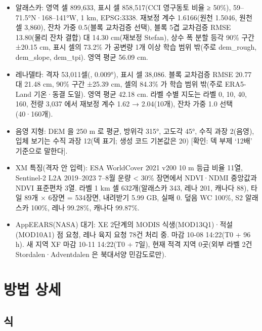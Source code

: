 \begin{itemize}[leftmargin=1.4em, itemsep=0.15em]
  \item 알래스카: 영역 셀 899,633, 표시 셀 858,517(CCI 영구동토 비율 ≥ 50\%), 59–71.5°N·168–141°W, 1 km, EPSG:3338. 재보정 계수 1.6166(원천 1.5046, 원천 셀 3,860), 잔차 가중 0.5(블록 교차검증 선택), 블록 5겹 교차검증 RMSE 13.80(물리 잔차 결합) 대 14.30 cm(재보정 Stefan), 상수 폭 분할 등각 90\% 구간 ±20.15 cm, 표시 셀의 73.2\% 가 공변량 1개 이상 학습 범위 밖(주로 dem\_rough, dem\_slope, dem\_tpi). 영역 평균 56.09 cm.
  \item 레나델타: 격자 53,011셀(, 0.009°), 표시 셀 38,086. 블록 교차검증 RMSE 20.77 대 21.48 cm, 90\% 구간 ±25.39 cm, 셀의 84.3\% 가 학습 범위 밖(주로 ERA5-Land 기온·동결 도일). 영역 평균 42.18 cm. 라벨 수별 지도는 라벨 0, 10, 40, 160, 전량 3,037 에서 재보정 계수 1.62 → 2.04(10개), 잔차 가중 1.0 선택(40·160개).
  \item 음영 지형: DEM 을 250 m 로 평균, 방위각 315°, 고도각 45°, 수직 과장 2(음영), 입체 보기는 수직 과장 12(덱 표기; 생성 코드 기본값은 20) [확인: 덱 부제 ‘12배’ 기준으로 말한다].
  \item XM 특징(격자 안 입력): ESA WorldCover 2021 v200 10 m 등급 비율 11열, Sentinel-2 L2A 2019–2023 7–8월 운량 < 30\% 장면에서 NDVI·NDMI 중앙값과 NDVI 표준편차 3열. 라벨 1 km 셀 632개(알래스카 343, 레나 201, 캐나다 88), 타일 89개 × 6장면 = 534장면, 내려받기 5.99 GB, 실패 0. 덮음 WC 100\%, S2 알래스카 100\%, 레나 99.28\%, 캐나다 99.87\%.
  \item AppEEARS(NASA) 대기: XE 2단계의 MODIS 식생(MOD13Q1)·적설(MOD10A1) 점 요청, 레나 육지 요청 78건 처리 중. 마감 10-08 14:22(T0 + 96 h). 새 지역 XF 마감 10-11 14:22(T0 + 7일), 현재 적격 지역 0곳(외부 라벨 2건 Stordalen·Adventdalen 은 북대서양 민감도로만).
\end{itemize}

\section{방법 상세}

\subsection{식}

